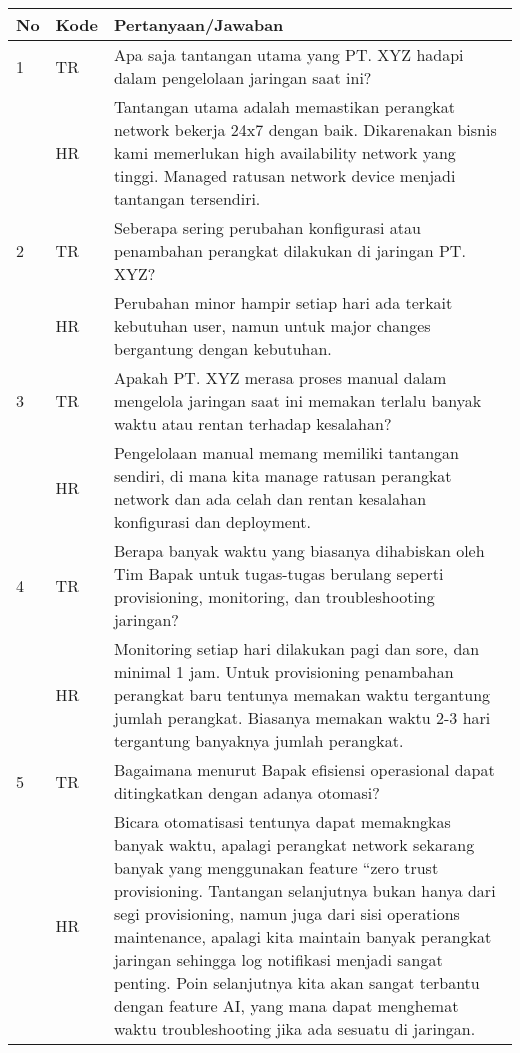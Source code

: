 \begin{longtable}{|p{1cm}|p{1.5cm}|p{11cm}|}
    \hline
    \textbf{No} & \textbf{Kode} & \textbf{Pertanyaan/Jawaban} \\
    \hline
    1 & TR & Apa saja tantangan utama yang PT. XYZ hadapi dalam pengelolaan jaringan saat ini? \\
    \hline
    & HR & Tantangan utama adalah memastikan perangkat network bekerja 24x7 dengan baik. Dikarenakan bisnis kami memerlukan high availability network yang tinggi. Managed ratusan network device menjadi tantangan tersendiri. \\
    \hline
    2 & TR & Seberapa sering perubahan konfigurasi atau penambahan perangkat dilakukan di jaringan PT. XYZ? \\
    \hline
    & HR & Perubahan minor hampir setiap hari ada terkait kebutuhan user, namun untuk major changes bergantung dengan kebutuhan. \\
    \hline
    3 & TR & Apakah PT. XYZ merasa proses manual dalam mengelola jaringan saat ini memakan terlalu banyak waktu atau rentan terhadap kesalahan? \\
    \hline
    & HR & Pengelolaan manual memang memiliki tantangan sendiri, di mana kita manage ratusan perangkat network dan ada celah dan rentan kesalahan konfigurasi dan deployment. \\
    \hline
    4 & TR & Berapa banyak waktu yang biasanya dihabiskan oleh Tim Bapak untuk tugas-tugas berulang seperti provisioning, monitoring, dan troubleshooting jaringan? \\
    \hline
    & HR & Monitoring setiap hari dilakukan pagi dan sore, dan minimal 1 jam. Untuk provisioning penambahan perangkat baru tentunya memakan waktu tergantung jumlah perangkat. Biasanya memakan waktu 2-3 hari tergantung banyaknya jumlah perangkat. \\
    \hline
    5 & TR & Bagaimana menurut Bapak efisiensi operasional dapat ditingkatkan dengan adanya otomasi? \\
    \hline
    & HR & Bicara otomatisasi tentunya dapat memakngkas banyak waktu, apalagi perangkat network sekarang banyak yang menggunakan feature “zero trust provisioning. Tantangan selanjutnya bukan hanya dari segi provisioning, namun juga dari sisi operations maintenance, apalagi kita maintain banyak perangkat jaringan sehingga log notifikasi menjadi sangat penting. Poin selanjutnya kita akan sangat terbantu dengan feature AI, yang mana dapat menghemat waktu troubleshooting jika ada sesuatu di jaringan. \\

\end{longtable}
